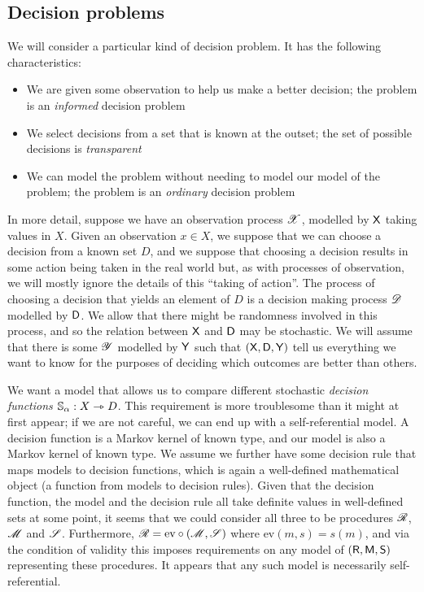 \subsection{Decision problems}

We will consider a particular kind of decision problem. It has the following characteristics:
\begin{itemize}
    \item We are given some observation to help us make a better decision; the problem is an \emph{informed} decision problem
    \item We select decisions from a set that is known at the outset; the set of possible decisions is \emph{transparent}
    \item We can model the problem without needing to model our model of the problem; the problem is an \emph{ordinary} decision problem
\end{itemize}

In more detail, suppose we have an observation process $\mathscr{X}$, modelled by $\mathsf{X}$ taking values in $X$. Given an observation $x\in X$, we suppose that we can choose a decision from a known set $D$, and we suppose that choosing a decision results in some action being taken in the real world but, as with processes of observation, we will mostly ignore the details of this ``taking of action''. The process of choosing a decision that yields an element of $D$ is a decision making process $\mathscr{D}$ modelled by $\mathsf{D}$. We allow that there might be randomness involved in this process, and so the relation between $\mathsf{X}$ and $\mathsf{D}$ may be stochastic.  We will assume that there is some $\mathscr{Y}$ modelled by $\mathsf{Y}$ such that $(\mathsf{X},\mathsf{D},\mathsf{Y})$ tell us everything we want to know for the purposes of deciding which outcomes are better than others.

We want a model that allows us to compare different stochastic \emph{decision functions} $\mathbb{S}_\alpha:X\rightarrowtriangle D$. This requirement is more troublesome than it might at first appear; if we are not careful, we can end up with a self-referential model. A decision function is a Markov kernel of known type, and our model is also a Markov kernel of known type. We assume we further have some decision rule that maps models to decision functions, which is again a well-defined mathematical object (a function from models to decision rules). Given that the decision function, the model and the decision rule all take definite values in well-defined sets at some point, it seems that we could consider all three to be procedures $\mathscr{R}$, $\mathscr{M}$ and $\mathscr{S}$. Furthermore, $\mathscr{R}=\text{ev}\circ(\mathscr{M},\mathscr{S})$ where $\text{ev}(m,s)=s(m)$, and via the condition of validity this imposes requirements on any model of $(\mathsf{R},\mathsf{M},\mathsf{S})$ representing these procedures. It appears that any such model is necessarily self-referential.

